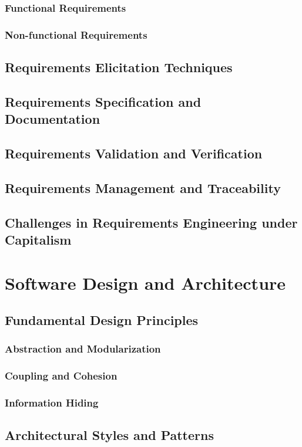 \subsubsection{Functional Requirements}
\subsubsection{Non-functional Requirements}
\subsection{Requirements Elicitation Techniques}
\subsection{Requirements Specification and Documentation}
\subsection{Requirements Validation and Verification}
\subsection{Requirements Management and Traceability}
\subsection{Challenges in Requirements Engineering under Capitalism}

\newpage

\section{Software Design and Architecture}
\subsection{Fundamental Design Principles}
\subsubsection{Abstraction and Modularization}
\subsubsection{Coupling and Cohesion}
\subsubsection{Information Hiding}
\subsection{Architectural Styles and Patterns}
